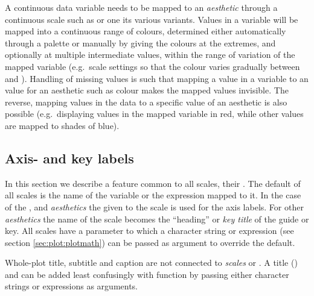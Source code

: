 \documentclass[krantz2]{krantz}\usepackage{knitr}%
\begin{document}
A continuous data variable needs to be mapped to an \emph{aesthetic} through a continuous scale such as  or one its various variants. Values in a  variable will be mapped into a continuous range of colours, determined either automatically through a palette or manually by giving the colours at the extremes, and optionally at multiple intermediate values, within the range of variation of the mapped variable (e.g.\ scale settings so that the colour varies gradually between  and ). Handling of missing values is such that mapping a value in a variable to an  value for an aesthetic such as colour makes the mapped values invisible. The reverse, mapping  values in the data to a specific value of an aesthetic is also possible (e.g.\ displaying  values in the mapped variable in red, while other values are mapped to shades of blue).

%
%

\subsection{Axis- and key labels}\label{sec:plot:scale:name}\label{sec:plot:labs}
In this section we describe a feature common to all scales, their . The default  of all scales is the name of the variable or the expression mapped to it. In the case of the ,  and  \emph{aesthetics} the  given to the scale is used for the axis labels. For other \emph{aesthetics} the name of the scale becomes the ``heading'' or \emph{key title} of the guide or key. All scales have a  parameter to which a character string or \Rlang expression (see section \ref{sec:plot:plotmath}) can be passed as argument to override the default.

Whole-plot title, subtitle and caption are not connected to \emph{scales} or . A title () and  can be added least confusingly with function  by passing either character strings or \Rlang expressions as arguments.
\end{document}
